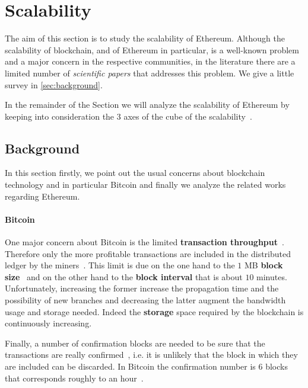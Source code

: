 \section{Scalability}
\label{sec:scalability}
The aim of this section is to study the scalability of Ethereum.
Although the scalability of blockchain, and of Ethereum in particular, is a
well-known problem and a major concern in the respective communities, in the
literature there are a limited number of \emph{scientific papers} that
addresses this problem.
We give a little survey in \autoref{sec:background}.

In the remainder of the Section we will analyze the scalability of Ethereum by
keeping into consideration the 3 axes of the cube of the
scalability~\cite{bib:art-of-scalability}.


\subsection{Background}

In this section firstly, we point out the usual concerns about blockchain
technology and in particular Bitcoin and finally we analyze the related works
regarding Ethereum.

\paragraph{Bitcoin} 
One major concern about Bitcoin is the limited \textbf{transaction
throughput}~\cite{bib:blockchain-challenges-opportunites-survey, bib:taxonomy}.
Therefore only the more profitable transactions are included in the distributed 
ledger by the
miners~\cite{bib:blockchain-challenges-opportunites-survey,wood2018ethereum}.
This limit is due on the one hand to the $1$ MB \textbf{block
	size}~\cite{bib:masteringbitcoin} and on the other
hand to the \textbf{block interval} that is about $10$ minutes.
Unfortunately, increasing the former increase the propagation time and
the possibility of new branches and decreasing the latter augment the
bandwidth usage and storage needed.
Indeed the \textbf{storage} space required by the blockchain is continuously
increasing.

Finally, a number of confirmation blocks are
needed to be sure that the transactions are really 
confirmed~\cite{bib:taxonomy}, i.e. it is unlikely that the block in which
they are included can be discarded.
In Bitcoin the 
confirmation number is 6 blocks that corresponds roughly to an hour~\cite{}.
 
